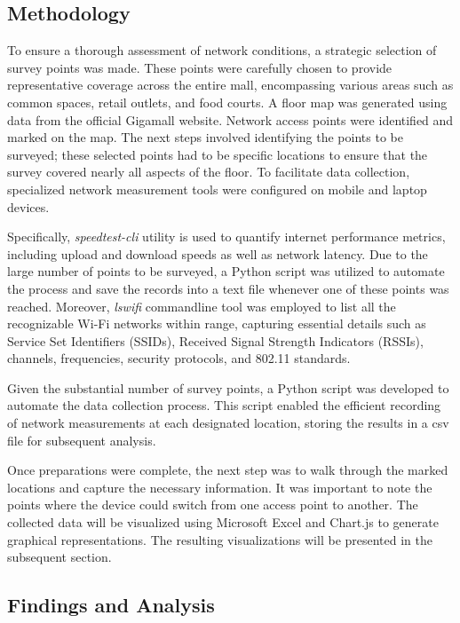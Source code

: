 \documentclass[conference]{IEEEtran}
\begin{document}
\subsection{Methodology}
To ensure a thorough assessment of network conditions, a strategic selection of survey points was made. These points were carefully chosen to provide representative coverage across the entire mall, encompassing various areas such as common spaces, retail outlets, and food courts. A floor map was generated using data from the official Gigamall website. Network access points were identified and marked on the map. The next steps involved identifying the points to be surveyed; these selected points had to be specific locations to ensure that the survey covered nearly all aspects of the floor. To facilitate data collection, specialized network measurement tools were configured on mobile and laptop devices. 

Specifically, \textit{speedtest-cli} utility is used to quantify internet performance metrics, including upload and download speeds as well as network latency. Due to the large number of points to be surveyed, a Python script was utilized to automate the process and save the records into a text file whenever one of these points was reached. Moreover, \textit{lswifi} commandline tool was employed to list all the recognizable Wi-Fi networks within range, capturing essential details such as Service Set Identifiers (SSIDs), Received Signal Strength Indicators (RSSIs), channels, frequencies, security protocols, and 802.11 standards.

Given the substantial number of survey points, a Python script was developed to automate the data collection process. This script enabled the efficient recording of network measurements at each designated location, storing the results in a csv file for subsequent analysis.

Once preparations were complete, the next step was to walk through the marked locations and capture the necessary information. It was important to note the points where the device could switch from one access point to another. The collected data will be visualized using Microsoft Excel and Chart.js to generate graphical representations. The resulting visualizations will be presented in the subsequent section.

\subsection{Findings and Analysis}
\end{document}
